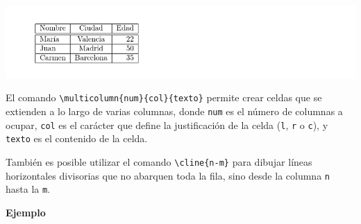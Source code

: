 \documentclass[
  a4paper,
]{scrreport}
\begin{document}
\begin{tcolorbox}[enhanced jigsaw, bottomrule=.15mm, leftrule=.75mm, opacityback=0, titlerule=0mm, bottomtitle=1mm, colbacktitle=quarto-callout-note-color!10!white, arc=.35mm, toprule=.15mm, colframe=quarto-callout-note-color-frame, title={Salida}, coltitle=black, colback=white, breakable, toptitle=1mm, rightrule=.15mm, left=2mm, opacitybacktitle=0.6]

\includegraphics{./img/tablas/tabla-delimitada.png}

\end{tcolorbox}

El comando \texttt{\textbackslash{}multicolumn\{num\}\{col\}\{texto\}}
permite crear celdas que se extienden a lo largo de varias columnas,
donde \texttt{num} es el número de columnas a ocupar, \texttt{col} es el
carácter que define la justificación de la celda (\texttt{l}, \texttt{r}
o \texttt{c}), y \texttt{texto} es el contenido de la celda.

También es posible utilizar el comando
\texttt{\textbackslash{}cline\{n-m\}} para dibujar líneas horizontales
divisorias que no abarquen toda la fila, sino desde la columna
\texttt{n} hasta la \texttt{m}.

\textbf{Ejemplo}
\end{document}
